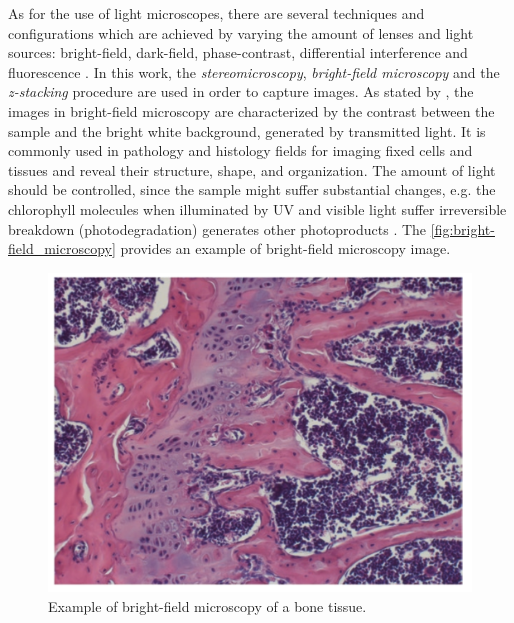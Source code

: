As for the use of light microscopes, there are several techniques and configurations which are achieved by varying the amount of lenses and light sources: bright-field, dark-field, phase-contrast, differential interference and fluorescence \cite{roane2009microscopic}. In this work, the \emph{stereomicroscopy}, \emph{bright-field microscopy} and the \emph{z-stacking} procedure are used in order to capture images. As stated by , the images in bright-field microscopy are characterized by the contrast between the sample and the bright white background, generated by transmitted light. It is commonly used in pathology and histology fields for imaging fixed cells and tissues and reveal their structure, shape, and organization. The amount of light should be controlled, since the sample might suffer substantial changes, e.g. the chlorophyll molecules when illuminated by UV and visible light suffer irreversible breakdown (photodegradation) generates other photoproducts \cite{petrovic2017clorophyll}. The \autoref{fig:bright-field_microscopy} provides an example of bright-field microscopy image.

\begin{figure}[htb]
	\centering
	\caption{\label{fig:bright-field_microscopy} Example of bright-field microscopy of a bone tissue.}
	\begin{center}
	    \includegraphics[scale=0.3]{images/bright-field_microscopy.png}
	\end{center}
	\centering
\end{figure}

